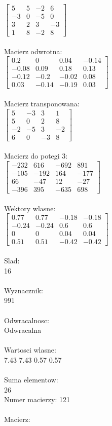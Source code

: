\documentclass[a4paper,12pt]{article}
\begin{document}
$\begin{bmatrix} 5&5&-2&6\\-3&0&-5&0\\3&2&3&-3\\1&8&-2&8 \end{bmatrix}$
\\
\\
Macierz odwrotna:\\

$\begin{bmatrix} 0.2&0&0.04&-0.14\\-0.08&0.09&0.18&0.13\\-0.12&-0.2&-0.02&0.08\\0.03&-0.14&-0.19&0.03 \end{bmatrix}$
\\
\\
Macierz transponowana:\\

$\begin{bmatrix} 5&-3&3&1\\5&0&2&8\\-2&-5&3&-2\\6&0&-3&8 \end{bmatrix}$
\\
\\
Macierz do potegi 3:\\

$\begin{bmatrix} -232&616&-692&891\\-105&-192&164&-177\\66&-47&12&-27\\-396&395&-635&698 \end{bmatrix}$
\\
\\
Wektory wlasne:\\

$\begin{bmatrix} 0.77&0.77&-0.18&-0.18\\-0.24&-0.24&0.6&0.6\\0&0&0.04&0.04\\0.51&0.51&-0.42&-0.42 \end{bmatrix}$
\\
\\
Slad:\\
16
\\
\\
Wyznacznik:\\
991
\\
\\
Odwracalnosc:\\
Odwracalna
\\
\\
Wartosci wlasne:\\
7.43 7.43 0.57 0.57
\\
\\
Suma elementow:\\
26
\\
\newpage
Numer macierzy:
121
\\
\\
Macierz:\\
\end{document}

